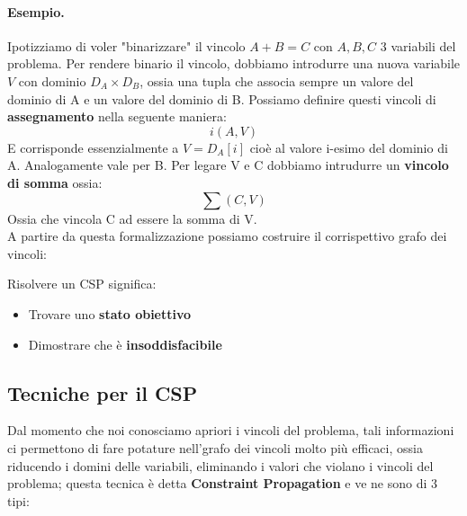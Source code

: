 \paragraph{Esempio.}Ipotizziamo di voler "binarizzare" il vincolo $A + B = C$ con $A,B,C$ 3 variabili del problema.
Per rendere binario il vincolo, dobbiamo introdurre una nuova variabile $V$ con dominio $D_A \times D_B$, ossia una tupla
che associa sempre un valore del dominio di A e un valore del dominio di B. Possiamo definire questi vincoli di \textbf{assegnamento} nella seguente maniera:
\begin{equation*}
    i(A,V) 
\end{equation*}
E corrisponde essenzialmente a $V = D_A [i]$ cioè al valore i-esimo del dominio di A. Analogamente vale per B.
Per legare V e C dobbiamo intrudurre un \textbf{vincolo di somma} ossia:
\begin{equation*}
    \sum(C,V)
\end{equation*}
Ossia che vincola C ad essere la somma di V.\\
A partire da questa formalizzazione possiamo costruire il corrispettivo grafo dei vincoli:
\begin{center}
\end{center}
Risolvere un CSP significa:
\begin{itemize}
    \item Trovare uno \textbf{stato obiettivo}
    \item Dimostrare che è \textbf{insoddisfacibile}
\end{itemize}

\subsection{Tecniche per il CSP}
Dal momento che noi conosciamo apriori i vincoli del problema, tali informazioni ci permettono di fare potature
nell'grafo dei vincoli molto più efficaci, ossia riducendo i domini delle variabili, eliminando i valori che violano
i vincoli del problema; questa tecnica è detta \textbf{Constraint Propagation} e ve ne sono di 3 tipi:
